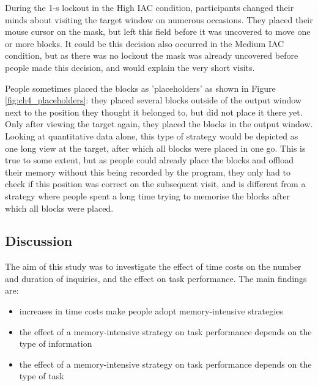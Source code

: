 During the 1-s lockout in the High IAC condition, participants changed their minds about visiting the target window on numerous occasions. They placed their mouse cursor on the mask, but left this field before it was uncovered to move one or more blocks. It could be this decision also occurred in the Medium IAC condition, but as there was no lockout the mask was already uncovered before people made this decision, and would explain the very short visits.

People sometimes placed the blocks as 'placeholders' as shown in Figure \ref{fig:ch4_placeholders}: they placed several blocks outside of the output window next to the position they thought it belonged to, but did not place it there yet. Only after viewing the target again, they placed the blocks in the output window. Looking at quantitative data alone, this type of strategy would be depicted as one long view at the target, after which all blocks were placed in one go. This is true to some extent, but as people could already place the blocks and offload their memory without this being recorded by the program, they only had to check if this position was correct on the subsequent visit, and is different from a strategy where people spent a long time trying to memorise the blocks after which all blocks were placed.

\newpage

\subsection{Discussion}
The aim of this study was to investigate the effect of time costs on the number and duration of inquiries, and the effect on task performance. The main findings are:

\begin{itemize}
\item
increases in time costs make people adopt memory-intensive strategies
\item
the effect of a memory-intensive strategy on task performance depends on the type of information
\item
the effect of a memory-intensive strategy on task performance depends on the type of task
\end{itemize}


